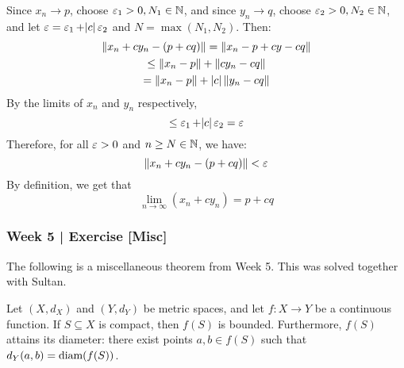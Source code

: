 \begin{pf}[source=Hana]
    Since $ x_{n} \rightarrow p $, choose $ \operatorname{\varepsilon}_{1} > 0, N_{1} \in \mathbb{N} $, and
    since $ y_{n} \rightarrow q $, choose $ \operatorname{\varepsilon}_{2} > 0, N_{2} \in \mathbb{N} $, and
    let $ \operatorname{\varepsilon} = \operatorname{\varepsilon}_{1} + \abs{c} \operatorname{\varepsilon}_{2} $ and $ N = \max(N_{1}, N_{2}) $. Then:
    \begin{gather*}
        \left\|x_{n}+cy_{n} - (p+cq)\right\| = \left\|x_{n}-p+cy-cq\right\| \\
        \leq \left\|x_{n}-p\right\| + \left\|cy_{n}-cq\right\| \\
        = \left\|x_{n}-p\right\| + \abs{c}\left\|y_{n}-cq\right\|
    \end{gather*}
    By the limits of $ x_{n} $ and $ y_{n} $ respectively,
    \begin{equation*}
        \leq \operatorname{\varepsilon}_{1} + \abs{c}\operatorname{\varepsilon}_{2} = \operatorname{\varepsilon}
    \end{equation*}
    Therefore, for all $ \operatorname{\varepsilon} > 0 $ and $ n \geq N \in \mathbb{N} $, we have:
    \begin{equation*}
        \left\|x_{n} + cy_{n}-(p+cq)\right\| < \operatorname{\varepsilon}
    \end{equation*}
    By definition, we get that
    \begin{equation*}
        \lim_{n\rightarrow\infty}(x_{n}+cy_{n}) = p+cq
    \end{equation*}
\end{pf}

\newpage
\subsubsection{Week 5 | Exercise [Misc]}

The following is a miscellaneous theorem from Week 5.
This was solved together with Sultan.

\begin{exr}[num=5.257]
    Let $ (X, d_{X}) $ and $ (Y, d_{Y}) $ be metric spaces, and let
    $ f:X\rightarrow Y $ be a continuous function. If $ S \subseteq X $ is
    compact, then $ f(S) $ is bounded. Furthermore, $ f(S) $ attains its
    diameter: there exist points $ a, b \in f(S) $ such that $ d_{Y}(a, b)
    = \textrm{diam}(f(S))$.
\end{exr}

